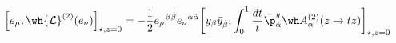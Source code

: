 \begin{equation}
\Big[e_\mu,\wh{\mathcal{L}}^{(2)}(e_\nu) \Big]_{\star,z=0}
  =  
-\frac12 e_\mu{}^{\beta\dot{\beta}}
e_\nu{}^{\alpha\dot{\alpha}}\bigg[y_\beta \bar{y}_{\dot{\beta}},
\int_0^1\frac{dt}{t}\bar{\p}^{y}_{\dot{\alpha}}
\wh A_\alpha^{(2)}(z\to tz)\bigg]_{\star,z=0}
\label{eq:eL2}
\end{equation}

